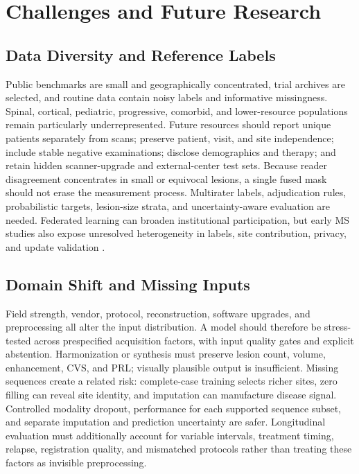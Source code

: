 \documentclass[journal,twoside,web]{ieeecolor}
\begin{document}
\section{Challenges and Future Research}\label{sec:challenges-and-future-research}

\subsection{Data Diversity and Reference Labels}\label{subsec:data-diversity-and-reference-labels}

Public benchmarks are small and geographically concentrated, trial archives are selected, and routine data contain noisy labels and informative missingness. Spinal, cortical, pediatric, progressive, comorbid, and lower-resource populations remain particularly underrepresented. Future resources should report unique patients separately from scans; preserve patient, visit, and site independence; include stable negative examinations; disclose demographics and therapy; and retain hidden scanner-upgrade and external-center test sets. Because reader disagreement concentrates in small or equivocal lesions, a single fused mask should not erase the measurement process. Multirater labels, adjudication rules, probabilistic targets, lesion-size strata, and uncertainty-aware evaluation are needed. Federated learning can broaden institutional participation, but early MS studies also expose unresolved heterogeneity in labels, site contribution, privacy, and update validation \cite{federated_ms,federated_ms2}.


\subsection{Domain Shift and Missing Inputs}\label{subsec:domain-shift-and-missing-inputs}

Field strength, vendor, protocol, reconstruction, software upgrades, and preprocessing all alter the input distribution. A model should therefore be stress-tested across prespecified acquisition factors, with input quality gates and explicit abstention. Harmonization or synthesis must preserve lesion count, volume, enhancement, CVS, and PRL; visually plausible output is insufficient. Missing sequences create a related risk: complete-case training selects richer sites, zero filling can reveal site identity, and imputation can manufacture disease signal. Controlled modality dropout, performance for each supported sequence subset, and separate imputation and prediction uncertainty are safer. Longitudinal evaluation must additionally account for variable intervals, treatment timing, relapse, registration quality, and mismatched protocols rather than treating these factors as invisible preprocessing.
\end{document}
